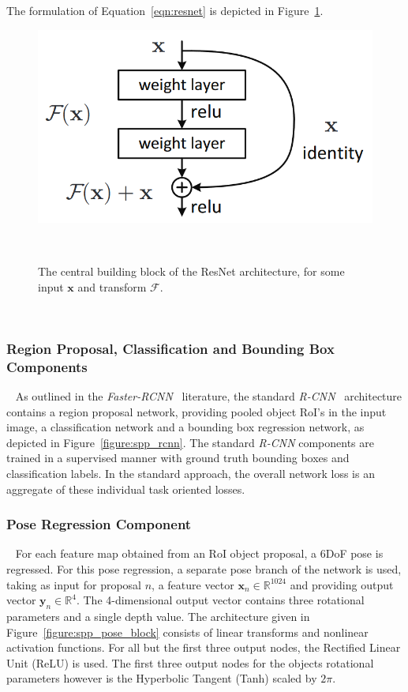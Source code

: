 The formulation of Equation~\ref{eqn:resnet} is depicted in Figure~\ref{figure:resnet_block}.
\begin{figure}[!htbp]
  \centering
  \includegraphics[width=.6\linewidth]{figures/spp/residual_block_he.png}
  \caption[ResNet Block]{The central building block of the ResNet architecture\footnotemark, for some input \( \bm{x} \) and 
  transform \( \mathcal{F} \).}
~\label{figure:resnet_block}
\end{figure}
~

\subsubsection{Region Proposal, Classification and Bounding Box Components}
~\label{subsub:spp_neural_rpn}
As outlined in the \textit{Faster-RCNN}~\cite{He2017} literature, the standard 
\textit{R-CNN}~\cite{Girshick2014,Girshick2015_2} architecture contains a region proposal 
network, providing pooled object RoI's in the input image, a classification network and 
a bounding box regression network, as depicted in Figure~\ref{figure:spp_rcnn}. The standard \textit{R-CNN} 
components are trained in a supervised manner with ground truth bounding boxes and classification labels. 
In the standard approach, the overall network loss is an aggregate of these individual task oriented losses.

\subsubsection{Pose Regression Component}
~\label{subsub:spp_neural_pose}
For each feature map obtained from an RoI object proposal, a 6DoF pose is regressed. For this 
pose regression, a separate pose branch of the network is used, taking as input for proposal \( n \), 
a feature vector \( \bm{x}_{n} \in \mathbb{R}^{1024} \) and providing output vector \( \bm{y}_{n} \in \mathbb{R}^{4} \). 
The 4-dimensional output vector contains three rotational parameters and a single depth value. The architecture 
given in Figure~\ref{figure:spp_pose_block} consists of linear transforms and nonlinear activation functions. 
For all but the first three output nodes, the Rectified Linear Unit (ReLU) is used. The first three output 
nodes for the objects rotational parameters however is the Hyperbolic Tangent (Tanh) scaled by \( 2\pi \).

